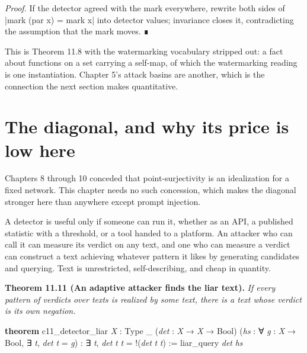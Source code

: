 \documentclass{memoir}
\begin{document}
\emph{Proof.} If the detector agreed with the mark everywhere, rewrite both sides of
\LeanVerb|mark (par x) = mark x| into detector values; invariance closes it,
contradicting the assumption that the mark moves. ∎

This is Theorem 11.8 with the watermarking vocabulary stripped out: a fact about
functions on a set carrying a self-map, of which the watermarking reading is one
instantiation. Chapter 5's attack basins are another, which is the connection
the next section makes quantitative.



\section{The diagonal, and why its price is low here}\label{Two--Schemas--of--Impossibility-005F-005F-005F--Machine--Checked--Limits--of--Trustworthy--Machine--Learning-005F-005F-005F--and--Why--They--Tighten--with--Capability----Watermarks-005F-005F-005F--Paraphrase-005F-005F-005F--and--the--Third--Corner----The--diagonal-005F-005F-005F--and--why--its--price--is--low--here}

Chapters 8 through 10 conceded that point-surjectivity is an idealization for a
fixed network. This chapter needs no such concession, which makes the diagonal
stronger here than anywhere except prompt injection.

A detector is useful only if someone can run it, whether as an API, a published
statistic with a threshold, or a tool handed to a platform. An attacker who can
call it can measure its verdict on any text, and one who can measure a verdict
can construct a text achieving whatever pattern it likes by generating
candidates and querying. Text is unrestricted, self-describing, and cheap in
quantity.

\textbf{Theorem 11.11 (An adaptive attacker finds the liar text).} \emph{If every
pattern of verdicts over texts is realized by some text, there is a text whose
verdict is its own negation.}

\begin{LeanVerbatim}
\textbf{theorem} c11_detector_liar \textit{X} : Type _ (\textit{det} : \textit{X} → \textit{X} → Bool)
    (\textit{hs} : ∀ \textit{g} : \textit{X} → Bool, ∃ \textit{t}, \textit{det} \textit{t} = \textit{g}) :
    ∃ \textit{t}, \textit{det} \textit{t} \textit{t} = !(\textit{det} \textit{t} \textit{t}) :=
  liar_query \textit{det} \textit{hs}

\end{LeanVerbatim}
\end{document}

